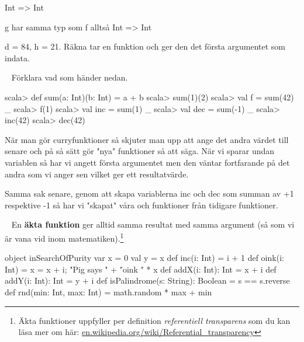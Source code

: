 \SubtaskSolved  Int => Int

g har samma typ som f alltså  Int => Int

\SubtaskSolved  d = 84, h = 21. Räkna tar en funktion och ger den det första argumentet som indata.



\QUESTEND









\QUESTBEGIN

\Task  \what~ Förklara vad som händer nedan.
\begin{REPL}
scala> def sum(a: Int)(b: Int) = a + b
scala> sum(1)(2)
scala> val f = sum(42) _
scala> f(1)
scala> val inc = sum(1) _
scala> val dec = sum(-1) _
scala> inc(42)
scala> dec(42)
\end{REPL}

\SOLUTION


\TaskSolved \what
 När man gör curryfunktioner så skjuter man upp att ange det andra värdet till senare och på så sätt gör "nya" funktioner så att säga. När vi sparar undan variablen  så har vi angett första argumentet men den väntar fortfarande på det andra som vi anger sen vilket ger ett resultatvärde.

Samma sak senare, genom att skapa variablerna inc och dec som summan av +1 respektive -1 så har vi "skapat" våra  och  funktioner från tidigare funktioner.



\QUESTEND


\QUESTBEGIN

\Task  \what~  En \textbf{äkta funktion} ger alltid samma resultat med samma argument  (så som vi är vana vid inom matematiken).\footnote{Äkta funktioner uppfyller per definition  \textit{referentiell transparens}  som du kan läsa mer om här:  \href{https://en.wikipedia.org/wiki/Referential_transparency}{en.wikipedia.org/wiki/Referential\_transparency}}

\begin{Code}
object inSearchOfPurity {
  var x = 0
  val y = x
  def inc(i: Int) = i + 1
  def oink(i: Int) = {x = x + i; "Pig says " + "oink " * x}
  def addX(i: Int): Int = x + i
  def addY(i: Int): Int = y + i
  def isPalindrome(s: String): Boolean = s == s.reverse
  def rnd(min: Int, max: Int) = math.random * max + min
}
\end{Code}

